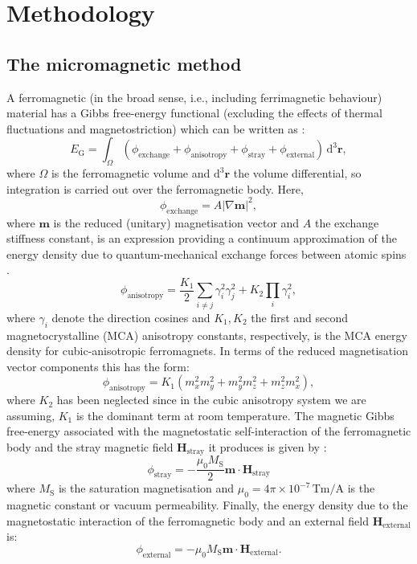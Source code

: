 \section{Methodology}
\subsection{The micromagnetic method}
A ferromagnetic (in the broad sense, i.e., including ferrimagnetic behaviour) material has a Gibbs free-energy functional (excluding the effects of thermal fluctuations and magnetostriction) which can be written as \citep{Brown}:
\begin{equation}
E_\text{G} = \int_{\Omega} (\phi_{\text{exchange}} + \phi_{\text{anisotropy}} + \phi_{\text{stray}} + \phi_{\text{external}})\,\text{d}^3 \boldsymbol{r},
\end{equation}
where $\Omega$ is the ferromagnetic volume and $\text{d}^3 \boldsymbol{r}$ the volume differential, so integration is carried out over the ferromagnetic body. Here,
\begin{equation}
\phi_{\text{exchange}}=A|\nabla\boldsymbol{m}|^2,
\end{equation}
where $\boldsymbol{m}$ is the reduced (unitary) magnetisation vector and $A$ the exchange stiffness constant, is an expression providing a continuum approximation of the energy density due to quantum-mechanical exchange forces between atomic spins \citep{Landau1935}.
\begin{equation}
\phi_{\text{anisotropy}}=\frac{K_1}{2}\sum_{i\neq j}\gamma_i^2\gamma_j^2 + K_2\prod_i\gamma_i^2,
\end{equation}
where $\gamma_i$ denote the direction cosines and $K_1,K_2$ the first and second magnetocrystalline (MCA) anisotropy constants, respectively, is the MCA energy density for cubic-anisotropic ferromagnets. In terms of the reduced magnetisation vector components this has the form:
\begin{equation}
\phi_{\text{anisotropy}}=K_1(m_x^2m_y^2+m_y^2m_z^2+m_z^2m_x^2),
\end{equation}
where $K_2$ has been neglected since in the cubic anisotropy system we are assuming, $K_1$ is the dominant term at room temperature. The magnetic Gibbs free-energy associated with the magnetostatic self-interaction of the ferromagnetic body and the stray magnetic field $\boldsymbol{H}_{\text{stray}}$ it produces is given by \citep{Brown}:
\begin{equation}
\phi_{\text{stray}}=-\frac{\mu_0M_\text{S}}{2} \boldsymbol{m} \cdot \boldsymbol{H}_{\text{stray}}
\end{equation}
where $M_\text{S}$ is the saturation magnetisation and $\mu_0=4\pi \times 10^{{-}7}\,\text{T}\text{m}/\text{A}$ is the magnetic constant or vacuum permeability. Finally, the energy density due to the magnetostatic interaction of the ferromagnetic body and an external field $\boldsymbol{H}_{\text{external}}$ is:
\begin{equation}
\phi_{\text{external}}=-\mu_0 M_{\text{S}} \boldsymbol{m} \cdot \boldsymbol{H}_{\text{external}}.
\end{equation}

